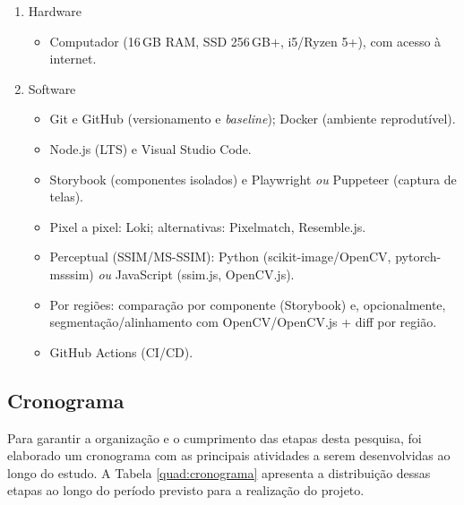 \documentclass{UNESC}
\begin{document}
 \begin{enumerate}
  \item Hardware
\begin{itemize}
  \item Computador (16\,GB RAM, SSD 256\,GB+, i5/Ryzen 5+), com acesso à internet.
\end{itemize}

  \item Software
\begin{itemize}
  \item Git e GitHub (versionamento e \textit{baseline}); Docker (ambiente reprodutível).
  \item Node.js (LTS) e Visual Studio Code.
  \item Storybook (componentes isolados) e Playwright \textit{ou} Puppeteer (captura de telas).
  \item Pixel a pixel: Loki; alternativas: Pixelmatch, Resemble.js.
  \item Perceptual (SSIM/MS-SSIM): Python (scikit-image/OpenCV, pytorch-msssim) \textit{ou} JavaScript (ssim.js, OpenCV.js).
  \item Por regiões: comparação por componente (Storybook) e, opcionalmente, segmentação/alinhamento com OpenCV/OpenCV.js + diff por região.
  \item GitHub Actions (CI/CD).
\end{itemize}
 \end{enumerate}

\subsection{Cronograma}
Para garantir a organização e o cumprimento das etapas desta pesquisa,
foi elaborado um cronograma com as principais atividades a serem desenvolvidas ao
longo do estudo. A Tabela \ref{quad:cronograma} apresenta a distribuição dessas etapas ao longo do período previsto para a realização do projeto.
\end{document}
